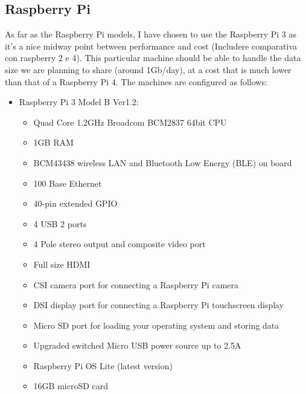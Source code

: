 \documentclass[a4paper,11pt]{scrartcl}
\begin{document}
\subsection{Raspberry Pi}
As far as the Raspberry Pi models, I have chosen to use the Raspberry Pi 3 as it's a nice midway point between performance and cost (Includere comparativa con raspberry 2 e 4). This particular machine should be able to handle the data size we are planning to share (around 1Gb/day), at a cost that is much lower than that of a Raspberry Pi 4. The machines are configured as follows:
\begin{itemize}
    \item Raspberry Pi 3 Model B Ver1.2:
    \begin{itemize}
        \item Quad Core 1.2GHz Broadcom BCM2837 64bit CPU
        \item 1GB RAM
        \item BCM43438 wireless LAN and Bluetooth Low Energy (BLE) on board
        \item 100 Base Ethernet
        \item 40-pin extended GPIO
        \item 4 USB 2 ports
        \item 4 Pole stereo output and composite video port
        \item Full size HDMI
        \item CSI camera port for connecting a Raspberry Pi camera
        \item DSI display port for connecting a Raspberry Pi touchscreen display
        \item Micro SD port for loading your operating system and storing data
        \item Upgraded switched Micro USB power source up to 2.5A
        \item Raspberry Pi OS Lite (latest version)
        \item 16GB microSD card
    \end{itemize}
\end{itemize}
\end{document}
